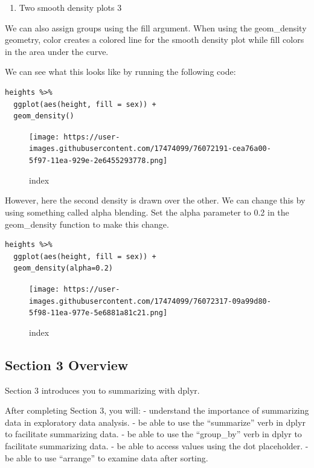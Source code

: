 \documentclass[
]{article}
\providecommand{\tightlist}{%
  \setlength{\itemsep}{0pt}\setlength{\parskip}{0pt}}
\begin{document}
\begin{enumerate}
\def\labelenumi{\arabic{enumi}.}
\setcounter{enumi}{21}
\tightlist
\item
  Two smooth density plots 3
\end{enumerate}

We can also assign groups using the fill argument. When using the
geom\_density geometry, color creates a colored line for the smooth
density plot while fill colors in the area under the curve.

We can see what this looks like by running the following code:

\begin{verbatim}
heights %>% 
  ggplot(aes(height, fill = sex)) + 
  geom_density() 
\end{verbatim}

\begin{figure}
\centering
\texttt{[image: https://user-images.githubusercontent.com/17474099/76072191-cea76a00-5f97-11ea-929e-2e6455293778.png]}
\caption{index}
\end{figure}

However, here the second density is drawn over the other. We can change
this by using something called alpha blending. Set the alpha parameter
to 0.2 in the geom\_density function to make this change.

\begin{verbatim}
heights %>% 
  ggplot(aes(height, fill = sex)) + 
  geom_density(alpha=0.2) 
\end{verbatim}

\begin{figure}
\centering
\texttt{[image: https://user-images.githubusercontent.com/17474099/76072317-09a99d80-5f98-11ea-977e-5e6881a81c21.png]}
\caption{index}
\end{figure}

\hypertarget{section-3-overview}{%
\subsection{Section 3 Overview}\label{section-3-overview}}

Section 3 introduces you to summarizing with dplyr.

After completing Section 3, you will: - understand the importance of
summarizing data in exploratory data analysis. - be able to use the
``summarize'' verb in dplyr to facilitate summarizing data. - be able to
use the ``group\_by'' verb in dplyr to facilitate summarizing data. - be
able to access values using the dot placeholder. - be able to use
``arrange'' to examine data after sorting.
\end{document}
